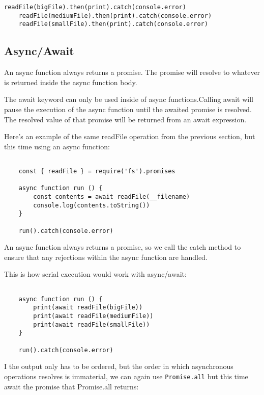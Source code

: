 \documentclass{scrartcl}
\begin{document}
\begin{lstlisting}[style=ES6]
    readFile(bigFile).then(print).catch(console.error)
    readFile(mediumFile).then(print).catch(console.error)
    readFile(smallFile).then(print).catch(console.error)
\end{lstlisting}

\subsection{Async/Await}

An async function always returns a promise. The promise will resolve to whatever is returned inside the async function body.

The await keyword can only be used inside of async functions.Calling await will pause the execution of the async function until the awaited promise is resolved. The resolved value of that promise will be returned from an await expression.

Here's an example of the same readFile operation from the previous section, but this time using an async function:

\begin{lstlisting}[style=ES6]

    const { readFile } = require('fs').promises

    async function run () {
        const contents = await readFile(__filename)
        console.log(contents.toString())
    }

    run().catch(console.error)

\end{lstlisting}

An async function always returns a promise, so we call the catch method to ensure that any rejections within the async function are handled.

This is how serial execution would work with async/await:

\begin{lstlisting}[style=ES6]

    async function run () {
        print(await readFile(bigFile))
        print(await readFile(mediumFile))
        print(await readFile(smallFile))
    }

    run().catch(console.error)

\end{lstlisting}

I the output only has to be ordered, but the order in which asynchronous operations resolves is immaterial, we can again use \lstinline|Promise.all| but this time await the promise that Promise.all returns:
\end{document}
